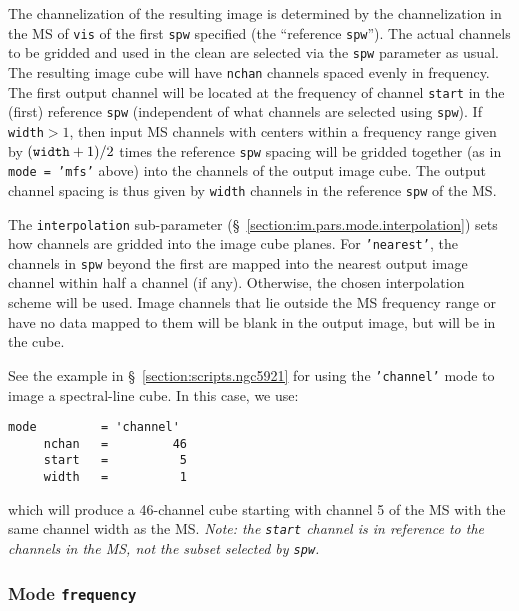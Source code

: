 The channelization of the resulting image is determined by the
channelization in the MS of {\tt vis} of the first {\tt spw} specified
(the ``reference {\tt spw}''). The actual channels to be gridded and
used in the clean are selected via the {\tt spw} parameter as usual.
The resulting image cube will have {\tt nchan} channels spaced evenly
in frequency.  The first output channel will be located at the
frequency of channel {\tt start} in the (first) reference {\tt spw}
(independent of what channels are selected using {\tt spw}).  If {\tt
  width}$ > 1$, then input MS channels with centers within a frequency
range given by $({\tt width}+1)/2$ times the reference {\tt spw}
spacing will be gridded together (as in {\tt mode = 'mfs'} above) into
the channels of the output image cube.  The output channel spacing is
thus given by {\tt width} channels in the reference {\tt spw} of the
MS.
  
The {\tt interpolation} sub-parameter
(\S~\ref{section:im.pars.mode.interpolation}) sets how channels are
gridded into the image cube planes.  For {\tt 'nearest'}, the
channels in {\tt spw} beyond the first are mapped
into the nearest output image channel within half a channel (if
any).  Otherwise, the chosen interpolation scheme will be used.
Image channels that lie outside the MS frequency range or
have no data mapped to them will be blank in the output image,
but will be in the cube.  

See the example in \S~\ref{section:scripts.ngc5921} for using the {\tt 'channel'}
mode to image a spectral-line cube. In this case, we use:
\small
\begin{verbatim}
mode         = 'channel'       
     nchan   =         46   
     start   =          5   
     width   =          1   
\end{verbatim}
\normalsize
which will produce a 46-channel cube starting with channel 5 of the MS
with the same channel width as the MS.  {\em Note: the {\tt start}
channel is in reference to the channels in the MS, not the subset
selected by {\tt spw}.}

\subsubsection{Mode {\tt frequency} }
\label{section:im.pars.mode.frequency}


